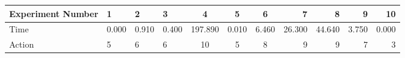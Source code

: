 \documentclass[8pt]{article}
\begin{document}
\begin{landscape}
\begin{tabular}{ | l | l | l | l | c | c | c | r | r | r | r | }
 \hline 
Experiment Number & 1 & 2 & 3 & 4 & 5 & 6 & 7 & 8 & 9 & 10\\ \hline
Time & 0.000 & 0.910 & 0.400 & 197.890 & 0.010 & 6.460 & 26.300 & 44.640 & 3.750 & 0.000\\ \hline
Action & 5 & 6 & 6 & 10 & 5 & 8 & 9 & 9 & 7 & 3\\ \hline\end{tabular}
\end{landscape}
\end{document}
